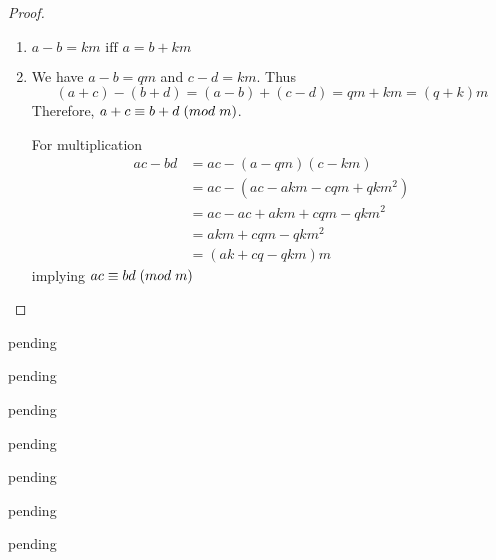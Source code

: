 \begin{exercise}
\begin{proof}
\begin{enumerate}
	            \item \( a - b = km \text{ iff } a = b + km \)
	            
	            \item We have \( a - b = qm \) and \( c - d = km \). Thus 
	            \[ (a+c) - (b+d) = (a-b) + (c-d) = qm + km = (q+k)m \]
	            Therefore, \( a+c \equiv b+d \hspace{1mm} (mod \hspace{1mm} m) \). 
	            
	            For multiplication
	            \begin{align*}
	                ac - bd &= ac - (a - qm)(c - km) \\
	                &= ac - (ac - akm - cqm + qkm^2) \\
	                &= ac - ac + akm + cqm - qkm^2 \\
	                &= akm + cqm - qkm^2 \\
	                &= (ak + cq - qkm)m
	            \end{align*}
	            implying \( ac \equiv bd \hspace{1mm} (mod \hspace{1mm} m) \)
	        \end{enumerate}
	    \end{proof}
\end{exercise}

\begin{exercise} \label{0.67}
	pending
\end{exercise}

\begin{exercise} \label{0.68}
	pending
\end{exercise}

\begin{exercise} \label{0.69}
	pending
\end{exercise}

\begin{exercise} \label{0.70}
	pending
\end{exercise}

\begin{exercise} \label{0.71}
	pending
\end{exercise}

\begin{exercise} \label{0.72}
	pending
\end{exercise}

\begin{exercise} \label{0.73}
	pending
\end{exercise}

